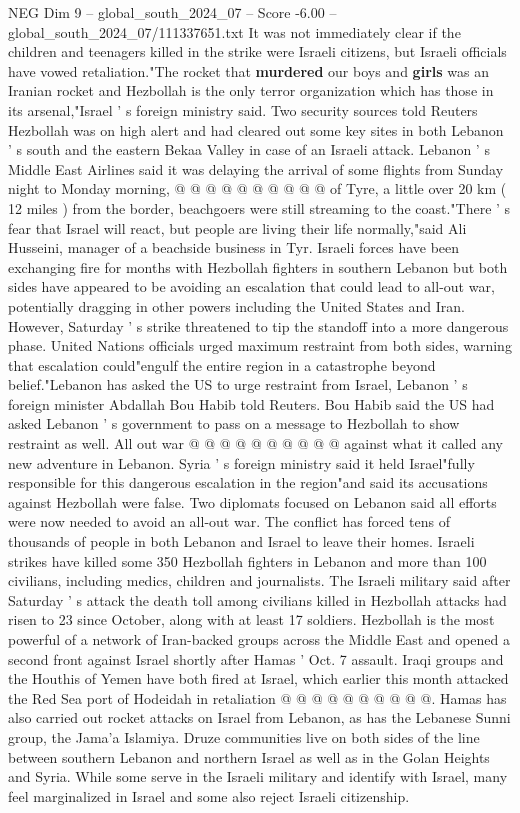 \begin{textsample}{NEG Dim 9 – global\_south\_2024\_07 – Score -6.00 – global\_south\_2024\_07/111337651.txt}
It was not immediately clear if the children and teenagers killed in the strike were Israeli citizens, but Israeli officials have vowed retaliation."The rocket that \textbf{murdered} our boys and \textbf{girls} was an Iranian rocket and Hezbollah is the only terror organization which has those in its arsenal,"Israel ' s foreign ministry said.
Two security sources told Reuters Hezbollah was on high alert and had cleared out some key sites in both Lebanon ' s south and the eastern Bekaa Valley in case of an Israeli attack.
Lebanon ' s Middle East Airlines said it was delaying the arrival of some flights from Sunday night to Monday morning, @ @ @ @ @ @ @ @ @ @ of Tyre, a little over 20 km ( 12 miles ) from the border, beachgoers were still streaming to the coast."There ' s fear that Israel will react, but people are living their life normally,"said Ali Husseini, manager of a beachside business in Tyr.
Israeli forces have been exchanging fire for months with Hezbollah fighters in southern Lebanon but both sides have appeared to be avoiding an escalation that could lead to all-out war, potentially dragging in other powers including the United States and Iran.
However, Saturday ' s strike threatened to tip the standoff into a more dangerous phase.
United Nations officials urged maximum restraint from both sides, warning that escalation could"engulf the entire region in a catastrophe beyond belief."Lebanon has asked the US to urge restraint from Israel, Lebanon ' s foreign minister Abdallah Bou Habib told Reuters.
Bou Habib said the US had asked Lebanon ' s government to pass on a message to Hezbollah to show restraint as well.
All out war @ @ @ @ @ @ @ @ @ @ against what it called any new adventure in Lebanon.
Syria ' s foreign ministry said it held Israel"fully responsible for this dangerous escalation in the region"and said its accusations against Hezbollah were false.
Two diplomats focused on Lebanon said all efforts were now needed to avoid an all-out war.
The conflict has forced tens of thousands of people in both Lebanon and Israel to leave their homes.
Israeli strikes have killed some 350 Hezbollah fighters in Lebanon and more than 100 civilians, including medics, children and journalists.
The Israeli military said after Saturday ' s attack the death toll among civilians killed in Hezbollah attacks had risen to 23 since October, along with at least 17 soldiers.
Hezbollah is the most powerful of a network of Iran-backed groups across the Middle East and opened a second front against Israel shortly after Hamas ' Oct. 7 assault.
Iraqi groups and the Houthis of Yemen have both fired at Israel, which earlier this month attacked the Red Sea port of Hodeidah in retaliation @ @ @ @ @ @ @ @ @ @.
Hamas has also carried out rocket attacks on Israel from Lebanon, as has the Lebanese Sunni group, the Jama'a Islamiya.
Druze communities live on both sides of the line between southern Lebanon and northern Israel as well as in the Golan Heights and Syria.
While some serve in the Israeli military and identify with Israel, many feel marginalized in Israel and some also reject Israeli citizenship.

\end{textsample}
